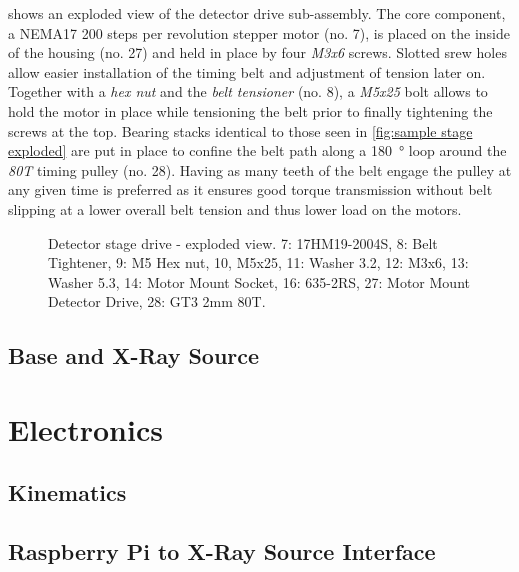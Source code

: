              shows an exploded view of the detector drive sub-assembly.
            The core component, a NEMA17 \num{200} steps per revolution stepper motor (no. 7), is placed on the inside of the housing (no. 27) and held in place by four \textit{M3x6} screws.
            Slotted srew holes allow easier installation of the timing belt and adjustment of tension later on.
            Together with a \textit{hex nut} and the \textit{belt tensioner} (no. 8), a \textit{M5x25} bolt allows to hold the motor in place while tensioning the belt prior to finally tightening the screws at the top.
            Bearing stacks identical to those seen in \cref{fig:sample stage exploded} are put in place to confine the belt path along a \qty{180}{\degree} loop around the \textit{80T} timing pulley (no. 28).
            Having as many teeth of the belt engage the pulley at any given time is preferred as it ensures good torque transmission without belt slipping at a lower overall belt tension and thus lower load on the motors.
            \begin{figure}[h]
                \centering
                
                \caption[Detector stage drive - exploded view.]{Detector stage drive - exploded view. 7: 17HM19-2004S, 8: Belt Tightener, 9: M5 Hex nut, 10, M5x25, 11: Washer 3.2, 12: M3x6, 13: Washer 5.3, 14: Motor Mount Socket, 16: 635-2RS, 27: Motor Mount Detector Drive, 28: GT3 2mm 80T.}
                \label{fig:detector drive exploded}
            \end{figure}
            
        \subsection{Base and X-Ray Source}
            \lipsum

    \section{Electronics}
        \subsection{Kinematics}

        \subsection{Raspberry Pi to X-Ray Source Interface}